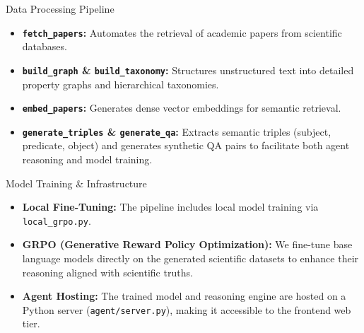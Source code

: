 \documentclass{beamer}
\begin{document}
\begin{frame}{Data Processing Pipeline}
    \begin{itemize}
        \item \textbf{\texttt{fetch\_papers}:} Automates the retrieval of academic papers from scientific databases.
        \item \textbf{\texttt{build\_graph} \& \texttt{build\_taxonomy}:} Structures unstructured text into detailed property graphs and hierarchical taxonomies.
        \item \textbf{\texttt{embed\_papers}:} Generates dense vector embeddings for semantic retrieval.
        \item \textbf{\texttt{generate\_triples} \& \texttt{generate\_qa}:} Extracts semantic triples (subject, predicate, object) and generates synthetic QA pairs to facilitate both agent reasoning and model training.
    \end{itemize}
\end{frame}

\begin{frame}{Model Training \& Infrastructure}
    \begin{itemize}
        \item \textbf{Local Fine-Tuning:} The pipeline includes local model training via \texttt{local\_grpo.py}.
        \item \textbf{GRPO (Generative Reward Policy Optimization):} We fine-tune base language models directly on the generated scientific datasets to enhance their reasoning aligned with scientific truths.
        \item \textbf{Agent Hosting:} The trained model and reasoning engine are hosted on a Python server (\texttt{agent/server.py}), making it accessible to the frontend web tier.
    \end{itemize}
\end{frame}
\end{document}
